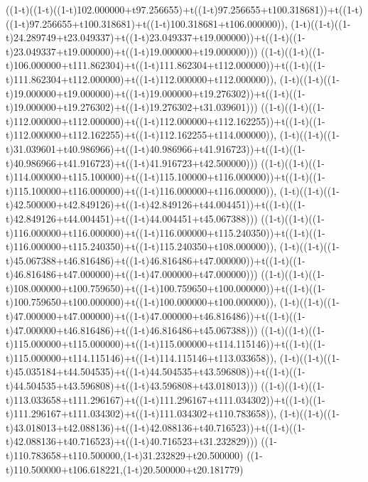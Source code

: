 ((1-t)((1-t)((1-t)102.000000+t97.256655)+t((1-t)97.256655+t100.318681))+t((1-t)((1-t)97.256655+t100.318681)+t((1-t)100.318681+t106.000000)),                                     (1-t)((1-t)((1-t)24.289749+t23.049337)+t((1-t)23.049337+t19.000000))+t((1-t)((1-t)23.049337+t19.000000)+t((1-t)19.000000+t19.000000)))
((1-t)((1-t)((1-t)106.000000+t111.862304)+t((1-t)111.862304+t112.000000))+t((1-t)((1-t)111.862304+t112.000000)+t((1-t)112.000000+t112.000000)),                                     (1-t)((1-t)((1-t)19.000000+t19.000000)+t((1-t)19.000000+t19.276302))+t((1-t)((1-t)19.000000+t19.276302)+t((1-t)19.276302+t31.039601)))
((1-t)((1-t)((1-t)112.000000+t112.000000)+t((1-t)112.000000+t112.162255))+t((1-t)((1-t)112.000000+t112.162255)+t((1-t)112.162255+t114.000000)),                                     (1-t)((1-t)((1-t)31.039601+t40.986966)+t((1-t)40.986966+t41.916723))+t((1-t)((1-t)40.986966+t41.916723)+t((1-t)41.916723+t42.500000)))
((1-t)((1-t)((1-t)114.000000+t115.100000)+t((1-t)115.100000+t116.000000))+t((1-t)((1-t)115.100000+t116.000000)+t((1-t)116.000000+t116.000000)),                                     (1-t)((1-t)((1-t)42.500000+t42.849126)+t((1-t)42.849126+t44.004451))+t((1-t)((1-t)42.849126+t44.004451)+t((1-t)44.004451+t45.067388)))
((1-t)((1-t)((1-t)116.000000+t116.000000)+t((1-t)116.000000+t115.240350))+t((1-t)((1-t)116.000000+t115.240350)+t((1-t)115.240350+t108.000000)),                                     (1-t)((1-t)((1-t)45.067388+t46.816486)+t((1-t)46.816486+t47.000000))+t((1-t)((1-t)46.816486+t47.000000)+t((1-t)47.000000+t47.000000)))
((1-t)((1-t)((1-t)108.000000+t100.759650)+t((1-t)100.759650+t100.000000))+t((1-t)((1-t)100.759650+t100.000000)+t((1-t)100.000000+t100.000000)),                                     (1-t)((1-t)((1-t)47.000000+t47.000000)+t((1-t)47.000000+t46.816486))+t((1-t)((1-t)47.000000+t46.816486)+t((1-t)46.816486+t45.067388)))
((1-t)((1-t)((1-t)115.000000+t115.000000)+t((1-t)115.000000+t114.115146))+t((1-t)((1-t)115.000000+t114.115146)+t((1-t)114.115146+t113.033658)),                                     (1-t)((1-t)((1-t)45.035184+t44.504535)+t((1-t)44.504535+t43.596808))+t((1-t)((1-t)44.504535+t43.596808)+t((1-t)43.596808+t43.018013)))
((1-t)((1-t)((1-t)113.033658+t111.296167)+t((1-t)111.296167+t111.034302))+t((1-t)((1-t)111.296167+t111.034302)+t((1-t)111.034302+t110.783658)),                                     (1-t)((1-t)((1-t)43.018013+t42.088136)+t((1-t)42.088136+t40.716523))+t((1-t)((1-t)42.088136+t40.716523)+t((1-t)40.716523+t31.232829)))
((1-t)110.783658+t110.500000,(1-t)31.232829+t20.500000)
((1-t)110.500000+t106.618221,(1-t)20.500000+t20.181779)
